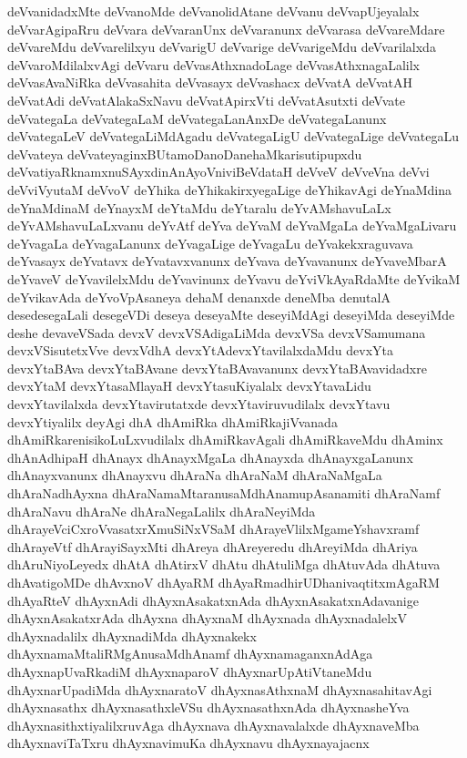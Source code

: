 {deVvanidadxMte
deVvanoMde
deVvanolidAtane
deVvanu
deVvapUjeyalalx
deVvarAgipaRru
deVvara
deVvaranUnx
deVvaranunx
deVvarasa
deVvareMdare
deVvareMdu
deVvarelilxyu
deVvarigU
deVvarige
deVvarigeMdu
deVvarilalxda
deVvaroMdilalxvAgi
deVvaru
deVvasAthxnadoLage
deVvasAthxnagaLalilx
deVvasAvaNiRka
deVvasahita
deVvasayx
deVvashacx
deVvatA
deVvatAH
deVvatAdi
deVvatAlakaSxNavu
deVvatApirxVti
deVvatAsutxti
deVvate
deVvategaLa
deVvategaLaM
deVvategaLanAnxDe
deVvategaLanunx
deVvategaLeV
deVvategaLiMdAgadu
deVvategaLigU
deVvategaLige
deVvategaLu
deVvateya
deVvateyaginxBUtamoDanoDanehaMkarisutipupxdu
deVvatiyaRknamxnuSAyxdinAnAyoVniviBeVdataH
deVveV
deVveVna
deVvi
deVviVyutaM
deVvoV
deYhika
deYhikakirxyegaLige
deYhikavAgi
deYnaMdina
deYnaMdinaM
deYnayxM
deYtaMdu
deYtaralu
deYvAMshavuLaLx
deYvAMshavuLaLxvanu
deYvAtf
deYva
deYvaM
deYvaMgaLa
deYvaMgaLivaru
deYvagaLa
deYvagaLanunx
deYvagaLige
deYvagaLu
deYvakekxraguvava
deYvasayx
deYvatavx
deYvatavxvanunx
deYvava
deYvavanunx
deYvaveMbarA
deYvaveV
deYvavilelxMdu
deYvavinunx
deYvavu
deYviVkAyaRdaMte
deYvikaM
deYvikavAda
deYvoVpAsaneya
dehaM
denanxde
deneMba
denutalA
desedesegaLali
desegeVDi
deseya
deseyaMte
deseyiMdAgi
deseyiMda
deseyiMde
deshe
devaveVSada
devxV
devxVSAdigaLiMda
devxVSa
devxVSamumana
devxVSisutetxVve
devxVdhA
devxYtAdevxYtavilalxdaMdu
devxYta
devxYtaBAva
devxYtaBAvane
devxYtaBAvavanunx
devxYtaBAvavidadxre
devxYtaM
devxYtasaMlayaH
devxYtasuKiyalalx
devxYtavaLidu
devxYtavilalxda
devxYtavirutatxde
devxYtaviruvudilalx
devxYtavu
devxYtiyalilx
deyAgi
dhA
dhAmiRka
dhAmiRkajiVvanada
dhAmiRkarenisikoLuLxvudilalx
dhAmiRkavAgali
dhAmiRkaveMdu
dhAminx
dhAnAdhipaH
dhAnayx
dhAnayxMgaLa
dhAnayxda
dhAnayxgaLanunx
dhAnayxvanunx
dhAnayxvu
dhAraNa
dhAraNaM
dhAraNaMgaLa
dhAraNadhAyxna
dhAraNamaMtaranusaMdhAnamupAsanamiti
dhAraNamf
dhAraNavu
dhAraNe
dhAraNegaLalilx
dhAraNeyiMda
dhArayeVciCxroVvasatxrXmuSiNxVSaM
dhArayeVlilxMgameYshavxramf
dhArayeVtf
dhArayiSayxMti
dhAreya
dhAreyeredu
dhAreyiMda
dhAriya
dhAruNiyoLeyedx
dhAtA
dhAtirxV
dhAtu
dhAtuliMga
dhAtuvAda
dhAtuva
dhAvatigoMDe
dhAvxnoV
dhAyaRM
dhAyaRmadhirUDhanivaqtitxmAgaRM
dhAyaRteV
dhAyxnAdi
dhAyxnAsakatxnAda
dhAyxnAsakatxnAdavanige
dhAyxnAsakatxrAda
dhAyxna
dhAyxnaM
dhAyxnada
dhAyxnadalelxV
dhAyxnadalilx
dhAyxnadiMda
dhAyxnakekx
dhAyxnamaMtaliRMgAnusaMdhAnamf
dhAyxnamaganxnAdAga
dhAyxnapUvaRkadiM
dhAyxnaparoV
dhAyxnarUpAtiVtaneMdu
dhAyxnarUpadiMda
dhAyxnaratoV
dhAyxnasAthxnaM
dhAyxnasahitavAgi
dhAyxnasathx
dhAyxnasathxleVSu
dhAyxnasathxnAda
dhAyxnasheYva
dhAyxnasithxtiyalilxruvAga
dhAyxnava
dhAyxnavalalxde
dhAyxnaveMba
dhAyxnaviTaTxru
dhAyxnavimuKa
dhAyxnavu
dhAyxnayajacnx
}
